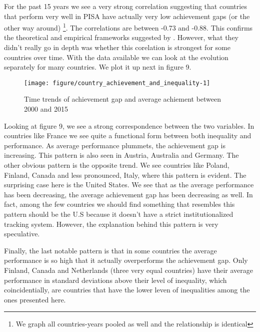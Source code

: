 \documentclass[11pt, a4paper]{article}\usepackage[]{graphicx}\usepackage[]{color}
\begin{document}
For the past 15 years we see a very strong correlation suggesting that countries that perform very well in PISA have actually very low achievement gaps (or the other way around) \footnote{We graph all countries-years pooled as well and the relationship is identical}. The correlations are between -0.73 and -0.88. This confirms the theoretical and empirical frameworks suggested by \citet{werfhorst_mijs}. However, what they didn't really go in depth was whether this corelation is strongest for some countries over time. With the data available we can look at the evolution separately for many countries. We plot it up next in figure 9.

\begin{figure}
\begin{center}


{\centering \texttt{[image: figure/country\_achievement\_and\_inequality-1]} 

}



\caption{Time trends of achievement gap and average achiement between 2000 and 2015}
\end{center}
\end{figure}

Looking at figure 9, we see a strong correspondence between the two variables. In countries like France we see quite a functional form between both inequality and performance. As average performance plummets, the achievement gap is increasing. This pattern is also seen in Austria, Australia and Germany. The other obvious pattern is the opposite trend. We see countries like Poland, Finland, Canada and less pronounced, Italy, where this pattern is evident. The surprising case here is the United States. We see that as the average performance has been decreasing, the average achievement gap has been decreasing as well. In fact, among the few countries we should find something that resembles this pattern should be the U.S because it doesn't have a strict institutionalized tracking system. However, the explanation behind this pattern is very speculative.

Finally, the last notable pattern is that in some countries the average performance is so high that it actually overperforms the achievement gap. Only Finland, Canada and Netherlands (three very equal countries) have their average performance in standard deviations above their level of inequality, which coincidentially, are countries that have the lower leven of inequalities among the ones presented here.






\end{document}
